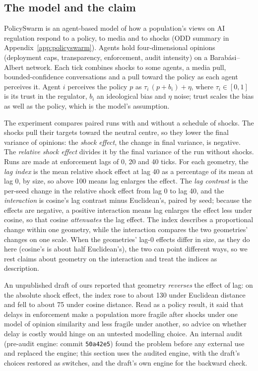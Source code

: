\documentclass[11pt]{article}
\begin{document}
\subsection{The model and the claim}
PolicySwarm \citep{policyswarm} is an agent-based model of how a population's views on AI regulation respond to a policy, to media and to shocks (ODD summary in Appendix~\ref{app:policyswarm}).
Agents hold four-dimensional opinions (deployment caps, transparency, enforcement, audit intensity) on a Barab\'asi--Albert network.
Each tick combines shocks to some agents, a media pull, bounded-confidence conversations and a pull toward the policy as each agent perceives it.
Agent $i$ perceives the policy $p$ as $\tau_i\,(p + b_i) + \eta$, where $\tau_i \in [0,1]$ is its trust in the regulator, $b_i$ an ideological bias and $\eta$ noise; trust scales the bias as well as the policy, which is the model's assumption.

The experiment compares paired runs with and without a schedule of shocks.
The shocks pull their targets toward the neutral centre, so they lower the final variance of opinions: the \emph{shock effect}, the change in final variance, is negative.
The \emph{relative shock effect} divides it by the final variance of the run without shocks.
Runs are made at enforcement lags of 0, 20 and 40 ticks.
For each geometry, the \emph{lag index} is the mean relative shock effect at lag 40 as a percentage of its mean at lag 0, by size, so above 100 means lag enlarges the effect.
The \emph{lag contrast} is the per-seed change in the relative shock effect from lag 0 to lag 40, and the \emph{interaction} is cosine's lag contrast minus Euclidean's, paired by seed; because the effects are negative, a positive interaction means lag enlarges the effect less under cosine, so that cosine \emph{attenuates} the lag effect.
The index describes a proportional change within one geometry, while the interaction compares the two geometries' changes on one scale.
When the geometries' lag-0 effects differ in size, as they do here (cosine's is about half Euclidean's), the two can point different ways, so we rest claims about geometry on the interaction and treat the indices as description.

An unpublished draft of ours reported that geometry \emph{reverses} the effect of lag: on the absolute shock effect, the index rose to about 130 under Euclidean distance and fell to about 75 under cosine distance.
Read as a policy result, it said that delays in enforcement make a population more fragile after shocks under one model of opinion similarity and less fragile under another, so advice on whether delay is costly would hinge on an untested modelling choice.
An internal audit (pre-audit engine: commit \texttt{50a42e5}) found the problem before any external use and replaced the engine; this section uses the audited engine, with the draft's choices restored as switches, and the draft's own engine for the backward check.
\end{document}
